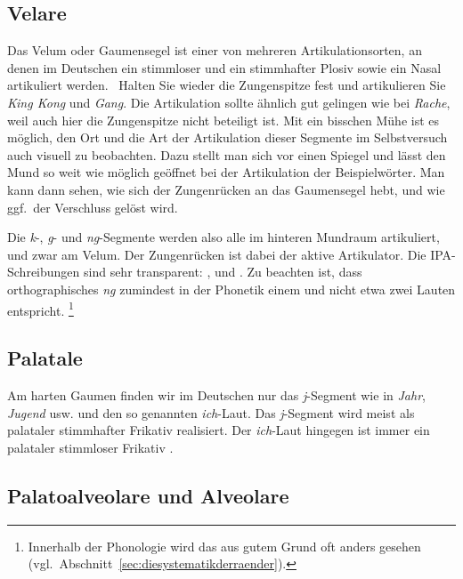 \subsection{Velare}
\label{sec:velare}


Das Velum oder Gaumensegel ist einer von mehreren Artikulationsorten, an denen im Deutschen ein stimmloser und ein stimmhafter Plosiv sowie ein Nasal artikuliert werden.
\TuBegin~Halten Sie wieder die Zungenspitze fest und artikulieren Sie \textit{King Kong} und \textit{Gang}.
Die Artikulation sollte ähnlich gut gelingen wie bei \textit{Rache}, weil auch hier die Zungenspitze nicht beteiligt ist.
Mit ein bisschen Mühe ist es möglich, den Ort und die Art der Artikulation dieser Segmente im Selbstversuch auch visuell zu beobachten.
Dazu stellt man sich vor einen Spiegel und lässt den Mund so weit wie möglich geöffnet bei der Artikulation der Beispielwörter.
Man kann dann sehen, wie sich der Zungenrücken an das Gaumensegel hebt, und wie ggf.\ der Verschluss gelöst wird.

Die \textit{k}-, \textit{g}- und \textit{ng}-Segmente werden also alle im hinteren Mundraum artikuliert, und zwar am Velum.
Der Zungenrücken ist dabei der aktive Artikulator.
Die IPA-Schreibungen sind sehr transparent: \textipa{[k]}, \textipa{[g]} und \textipa{[N]}.
Zu beachten ist, dass orthographisches \textit{ng} zumindest in der Phonetik einem und nicht etwa zwei Lauten entspricht.%
\footnote{Innerhalb der Phonologie wird das aus gutem Grund oft anders gesehen (vgl.\ Abschnitt~\ref{sec:diesystematikderraender}).}

\subsection{Palatale}
\label{sec:palatale}


Am harten Gaumen finden wir im Deutschen nur das \textit{j}-Segment wie in \textit{Jahr}, \textit{Jugend} usw. und den so genannten \textit{ich}-Laut.
Das \textit{j}-Segment wird meist als palataler stimmhafter Frikativ \textipa{[J]} realisiert.
Der \textit{ich}-Laut hingegen ist immer ein palataler stimmloser Frikativ \textipa{[\c{c}]}.

\subsection{Palatoalveolare und Alveolare}
\label{sec:palatoalveolareundalveolare}

